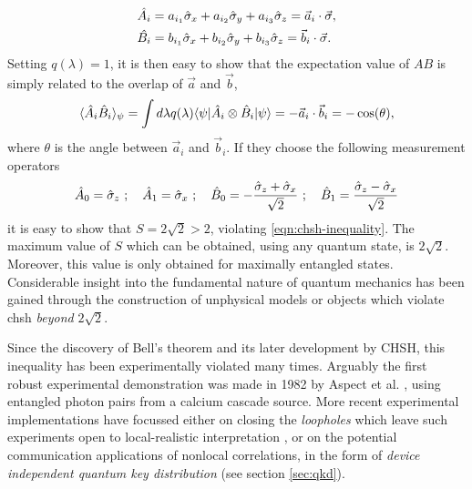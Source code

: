 \begin{align}
    &\hat{A_i} = a_{i_1} \hat{\sigma}_x + a_{i_2} \hat{\sigma}_y + a_{i_3} \hat{\sigma}_z = \vec{a}_i \cdot \vec{\sigma},\\
    &\hat{B_i} = b_{i_1} \hat{\sigma}_x + b_{i_2} \hat{\sigma}_y + b_{i_3} \hat{\sigma}_z = \vec{b}_i \cdot \vec{\sigma}.
    \label{eqn:bloch-vectors}
\end{align}
Setting $q(\lambda)=1$, it is then easy to show that the expectation value of $AB$ is simply related to the overlap of $\vec{a}$ and $\vec{b}$,
\begin{equation}
    \langle \hat{A}_i \hat{B}_i \rangle_{\psi} = \int d \lambda q(\lambda) \mbox{$ \langle \psi | $} \hat{A}_i \otimes \hat{B}_i  \mbox{$ | \psi \rangle $} = - \vec{a}_i \cdot \vec{b}_i = -\cos(\theta),
\end{equation}
where $\theta$ is the angle between $\vec{a}_i$ and $\vec{b}_i$.
If they choose the following measurement operators
\begin{equation}
\hat{A}_0 = \hat{\sigma}_z ~ ; ~~~
\hat{A}_1 = \hat{\sigma}_x ~ ; ~~~
\hat{B}_0 = -\frac{\hat{\sigma}_z+\hat{\sigma}_x}{\sqrt{2}} ~ ; ~~~
\hat{B}_1 = \frac{\hat{\sigma}_z-\hat{\sigma}_x}{\sqrt{2}}
\end{equation}
it is easy to show that $S=2\sqrt{2} > 2$, violating \ref{eqn:chsh-inequality}. The maximum value of $S$ which can be obtained, using any quantum state, is $2\sqrt{2}$. Moreover, this value is only obtained for maximally entangled states. Considerable insight into the fundamental nature of quantum mechanics has been gained \cite{Popescu1994, Tsirelson1993, Brunner2013} through the construction of unphysical models or objects which violate \gls{chsh} \emph{beyond} $2\sqrt{2}$.

Since the discovery of Bell's theorem and its later development by CHSH, this inequality has been experimentally violated many times. 
Arguably the first robust experimental demonstration was made in 1982 by Aspect et al. \cite{Aspect1982c}, using entangled photon pairs from a calcium cascade source. 
More recent experimental implementations have focussed either on closing the \emph{loopholes} which leave such experiments open to local-realistic interpretation \cite{Giustina2013, Scheidl2010}, or on the potential communication applications of nonlocal correlations, in the form of \emph{device independent quantum key distribution} (see section \ref{sec:qkd}). 

